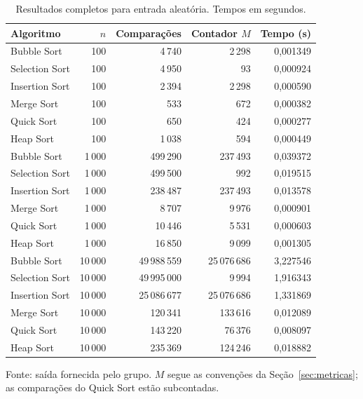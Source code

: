 \begin{table}[htbp]
\centering
\small
\caption{Resultados completos para entrada aleatória. Tempos em segundos.}
\label{tab:random}
\begin{tabular}{lrrrr}
\toprule
Algoritmo & $n$ & Comparações & Contador $M$ & Tempo (s) \\
\midrule
Bubble Sort & 100 & 4\,740 & 2\,298 & 0,001349 \\
Selection Sort & 100 & 4\,950 & 93 & 0,000924 \\
Insertion Sort & 100 & 2\,394 & 2\,298 & 0,000590 \\
Merge Sort & 100 & 533 & 672 & 0,000382 \\
Quick Sort & 100 & 650 & 424 & 0,000277 \\
Heap Sort & 100 & 1\,038 & 594 & 0,000449 \\
\midrule
Bubble Sort & 1\,000 & 499\,290 & 237\,493 & 0,039372 \\
Selection Sort & 1\,000 & 499\,500 & 992 & 0,019515 \\
Insertion Sort & 1\,000 & 238\,487 & 237\,493 & 0,013578 \\
Merge Sort & 1\,000 & 8\,707 & 9\,976 & 0,000901 \\
Quick Sort & 1\,000 & 10\,446 & 5\,531 & 0,000603 \\
Heap Sort & 1\,000 & 16\,850 & 9\,099 & 0,001305 \\
\midrule
Bubble Sort & 10\,000 & 49\,988\,559 & 25\,076\,686 & 3,227546 \\
Selection Sort & 10\,000 & 49\,995\,000 & 9\,994 & 1,916343 \\
Insertion Sort & 10\,000 & 25\,086\,677 & 25\,076\,686 & 1,331869 \\
Merge Sort & 10\,000 & 120\,341 & 133\,616 & 0,012089 \\
Quick Sort & 10\,000 & 143\,220 & 76\,376 & 0,008097 \\
Heap Sort & 10\,000 & 235\,369 & 124\,246 & 0,018882 \\
\bottomrule
\end{tabular}
\par\smallskip\footnotesize Fonte: saída fornecida pelo grupo. $M$ segue as convenções da Seção~\ref{sec:metricas}; as comparações do Quick Sort estão subcontadas.
\end{table}
